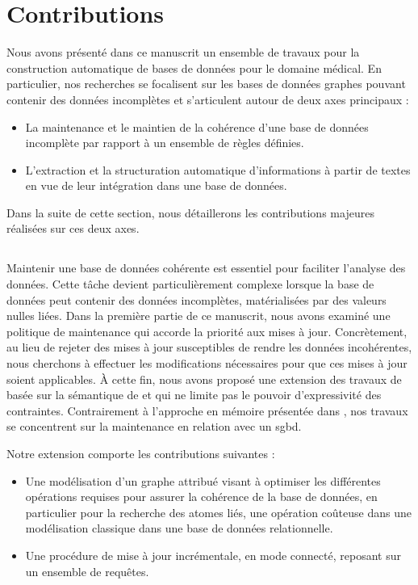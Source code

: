 \section{Contributions}

Nous avons présenté dans ce manuscrit un ensemble de travaux pour la construction automatique de bases de données pour le domaine médical.
En particulier, nos recherches se focalisent sur les bases de données graphes pouvant contenir des données incomplètes et s'articulent autour de deux axes principaux :
\begin{itemize}
    \item La maintenance et le maintien de la cohérence d'une base de données incomplète par rapport à un ensemble de règles définies.

    \item L'extraction et la structuration automatique d'informations à partir de textes en vue de leur intégration dans une base de données.
\end{itemize}

Dans la suite de cette section, nous détaillerons les contributions majeures réalisées sur ces deux axes.

\subsection{}

Maintenir une base de données cohérente est essentiel pour faciliter l'analyse des données.
Cette tâche devient particulièrement complexe lorsque la base de données peut contenir des données incomplètes, matérialisées par des valeurs nulles liées.
Dans la première partie de ce manuscrit, nous avons examiné une politique de maintenance qui accorde la priorité aux mises à jour.
Concrètement, au lieu de rejeter des mises à jour susceptibles de rendre les données incohérentes, nous cherchons à effectuer les modifications nécessaires pour que ces mises à jour soient applicables.
À cette fin, nous avons proposé une extension des travaux de \cite{chabinConsistentUpdatingDatabases2020} basée sur la sémantique de \cite{reiterSoundSometimesComplete1986} et qui ne limite pas le pouvoir d'expressivité des contraintes.
Contrairement à l'approche en mémoire présentée dans \cite{chabinConsistentUpdatingDatabases2020}, nos travaux se concentrent sur la maintenance en relation avec un \gls{sgbd}.

Notre extension comporte les contributions suivantes :
\begin{itemize}
    \item Une modélisation d'un graphe attribué visant à optimiser les différentes opérations requises pour assurer la cohérence de la base de données, en particulier pour la recherche des atomes liés, une opération coûteuse dans une modélisation classique dans une base de données relationnelle.
    
    \item Une procédure de mise à jour incrémentale, en mode connecté, reposant sur un ensemble de requêtes.
\end{itemize}

